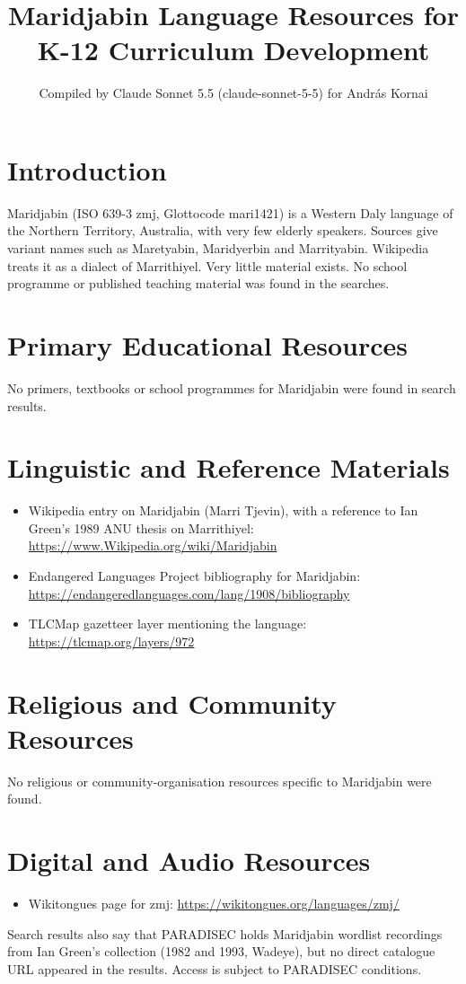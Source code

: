 \documentclass[12pt]{article}
\title{Maridjabin Language Resources for K-12 Curriculum Development}
\author{Compiled by Claude Sonnet 5.5 (claude-sonnet-5-5) for Andr\'as Kornai}
\date{}
\begin{document}
\maketitle

\section{Introduction}
Maridjabin (ISO 639-3 zmj, Glottocode mari1421) is a Western Daly language of the Northern Territory, Australia, with very few elderly speakers. Sources give variant names such as Maretyabin, Maridyerbin and Marrityabin. Wikipedia treats it as a dialect of Marrithiyel. Very little material exists. No school programme or published teaching material was found in the searches.

\section{Primary Educational Resources}
No primers, textbooks or school programmes for Maridjabin were found in search results.

\section{Linguistic and Reference Materials}
\begin{itemize}
\item Wikipedia entry on Maridjabin (Marri Tjevin), with a reference to Ian Green's 1989 ANU thesis on Marrithiyel: \url{https://www.Wikipedia.org/wiki/Maridjabin}
\item Endangered Languages Project bibliography for Maridjabin: \url{https://endangeredlanguages.com/lang/1908/bibliography}
\item TLCMap gazetteer layer mentioning the language: \url{https://tlcmap.org/layers/972}
\end{itemize}

\section{Religious and Community Resources}
No religious or community-organisation resources specific to Maridjabin were found.

\section{Digital and Audio Resources}
\begin{itemize}
\item Wikitongues page for zmj: \url{https://wikitongues.org/languages/zmj/}
\end{itemize}
Search results also say that PARADISEC holds Maridjabin wordlist recordings from Ian Green's collection (1982 and 1993, Wadeye), but no direct catalogue URL appeared in the results. Access is subject to PARADISEC conditions.
\end{document}
